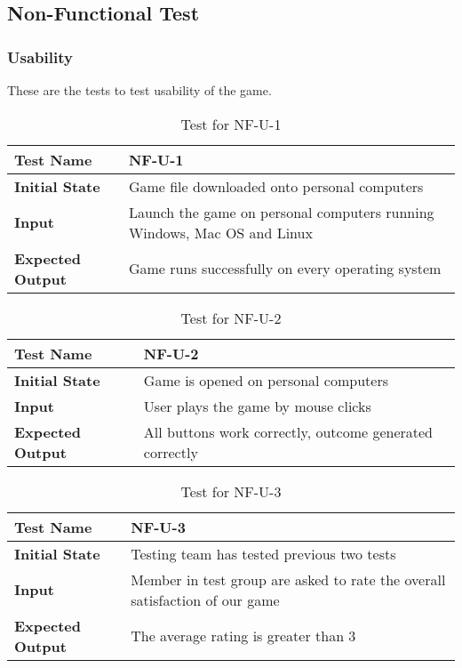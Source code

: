 \documentclass[12,english]{article}
\begin{document}
    \subsection{Non-Functional Test}
    
        \subsubsection{Usability}
        These are the tests to test usability of the game.
        \begin{table}[h!]
        	\begin{tabular}[r]{|l|l|}
        	    \hline
        		\textbf{Test Name} & NF-U-1 \\ 
        		\hline
        		\textbf{Initial State} & Game file downloaded onto personal computers\\ 
        		\hline
        		\textbf{Input} & Launch the game on personal computers running Windows, Mac OS and Linux\\ 
        		\hline 
        		\textbf{Expected Output} & Game runs successfully on every operating system\\ 
        		\hline
        	\end{tabular}
        	\caption{Test for NF-U-1}
        	\label{Table}
        \end{table}
        
        \begin{table}[h!]
        	\begin{tabular}[r]{|l|l|}
        	    \hline
        		\textbf{Test Name} & NF-U-2 \\ 
        		\hline
        		\textbf{Initial State} & Game is opened on personal computers\\ 
        		\hline
        		\textbf{Input} & User plays the game by mouse clicks\\ 
        		\hline 
        		\textbf{Expected Output} & All buttons work correctly, outcome generated correctly\\ 
        		\hline
        	\end{tabular}
        	\caption{Test for NF-U-2}
        	\label{Table}
        \end{table}
        
        \begin{table}[h!]
        	\begin{tabular}[r]{|l|l|}
        	    \hline
        		\textbf{Test Name} & NF-U-3 \\ 
        		\hline
        		\textbf{Initial State} & Testing team has tested previous two tests\\ 
        		\hline
        		\textbf{Input} & Member in test group are asked to rate the overall satisfaction of our game\\ 
        		\hline 
        		\textbf{Expected Output} & The average rating is greater than 3\\ 
        		\hline
        	\end{tabular}
        	\caption{Test for NF-U-3}
        	\label{Table}
        \end{table}
        
\end{document}
